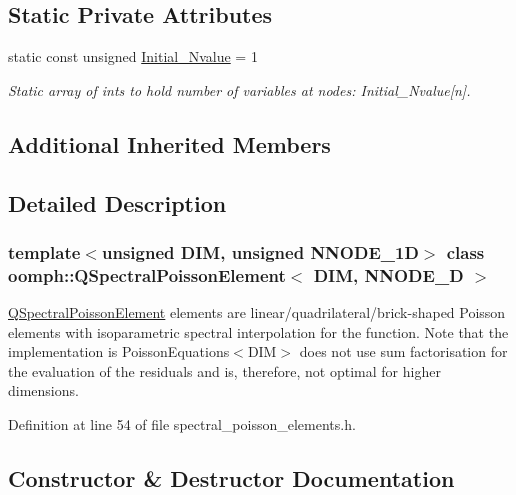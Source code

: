 \subsection*{Static Private Attributes}
\begin{DoxyCompactItemize}
\item 
static const unsigned \hyperlink{classoomph_1_1QSpectralPoissonElement_aaabc5076bdcd68f361cc6d2b76b12608}{Initial\+\_\+\+Nvalue} = 1
\begin{DoxyCompactList}\small\item\em Static array of ints to hold number of variables at nodes\+: Initial\+\_\+\+Nvalue\mbox{[}n\mbox{]}. \end{DoxyCompactList}\end{DoxyCompactItemize}
\subsection*{Additional Inherited Members}


\subsection{Detailed Description}
\subsubsection*{template$<$unsigned D\+IM, unsigned N\+N\+O\+D\+E\+\_\+1D$>$\newline
class oomph\+::\+Q\+Spectral\+Poisson\+Element$<$ D\+I\+M, N\+N\+O\+D\+E\+\_\+D $>$}

\hyperlink{classoomph_1_1QSpectralPoissonElement}{Q\+Spectral\+Poisson\+Element} elements are linear/quadrilateral/brick-\/shaped Poisson elements with isoparametric spectral interpolation for the function. Note that the implementation is Poisson\+Equations$<$\+D\+I\+M$>$ does not use sum factorisation for the evaluation of the residuals and is, therefore, not optimal for higher dimensions. 

Definition at line 54 of file spectral\+\_\+poisson\+\_\+elements.\+h.



\subsection{Constructor \& Destructor Documentation}
\mbox{\label{classoomph_1_1QSpectralPoissonElement_a182407c61e120d9b2d62c44d2ba99139}} 
